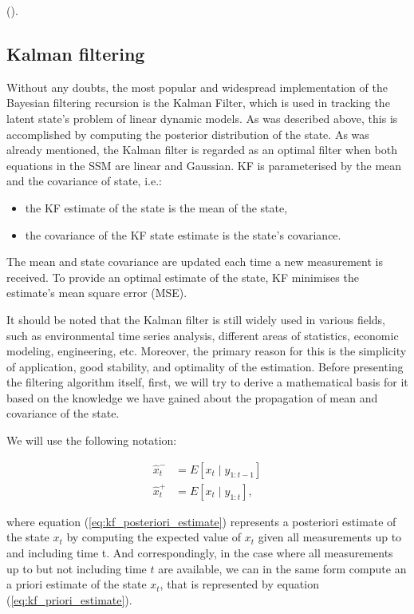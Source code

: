 (\cite[Chapter~3]{simon_optimal_2006}).

\subsection{Kalman filtering}
Without any doubts, the most popular and widespread implementation of the Bayesian filtering recursion is the Kalman Filter, which is used in tracking the latent state's problem of linear dynamic models. As was described above, this is accomplished by computing the posterior distribution of the state. As was already mentioned, the Kalman filter is regarded as an optimal filter when both equations in the SSM are linear and Gaussian. KF is parameterised by the mean and the covariance of state, i.e.:
\begin{itemize}
    \item the KF estimate of the state is the mean of the state,
    \item the covariance of the KF state estimate is the state's covariance.
\end{itemize}

The mean and state covariance are updated each time a new measurement is received. To provide an optimal estimate of the state, KF minimises the estimate's mean square error (MSE).

It should be noted that the Kalman filter is still widely used in various fields, such as environmental time series analysis, different areas of statistics, economic modeling, engineering, etc. Moreover, the primary reason for this is the simplicity of application, good stability, and optimality of the estimation. Before presenting the filtering algorithm itself, first, we will try to derive a mathematical basis for it based on the knowledge we have gained about the propagation of mean and covariance of the state.

We will use the following notation:

\begin{subequations}
\begin{align}
\hat{x}_t^{-}&=E\left[x_t \mid y_{1:t-1}\right]
\label{eq:kf_priori_estimate} \\ 
\hat{x}_t^{+}&=E\left[x_t \mid y_{1:t}\right], \label{eq:kf_posteriori_estimate}
\end{align}
\end{subequations}

\noindent where equation (\ref{eq:kf_posteriori_estimate}) represents a posteriori estimate of the state \(x_t\) by computing the expected value of \(x_t\) given all measurements up to and including time t. And correspondingly, in the case where all measurements up to but not including time \(t\) are available, we can in the same form compute an a priori estimate of the state \(x_t\), that is represented by equation (\ref{eq:kf_priori_estimate}).

